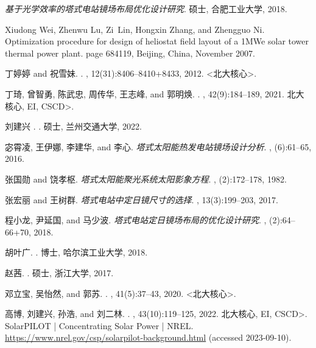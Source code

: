 \documentclass[withoutpreface,bwprint]{cumcmthesis} %
\begin{document}
\begin{thebibliography}{99}%
{\it 基于光学效率的塔式电站镜场布局优化设计研究}.
\newblock 硕士, 合肥工业大学, 2018.


Xiudong Wei, Zhenwu Lu, Zi~Lin, Hongxin Zhang, and Zhengguo Ni.
\newblock Optimization procedure for design of heliostat field layout of a
  {1MWe} solar tower thermal power plant.
\newblock page 684119, Beijing, China, November 2007.

 丁婷婷 and  祝雪妹.
.
, 12(31):8406--8410+8433, 2012.
{\textless}北大核心{\textgreater}.

 丁琦,  曾智勇,  陈武忠,  周传华,  王志峰, and  郭明焕.
.
, 42(9):184--189, 2021.
\newblock {\textless}北大核心, EI, CSCD{\textgreater}.

刘建兴 .
.
\newblock 硕士, 兰州交通大学, 2022.

 宓霄凌,  王伊娜,  李建华, and  李心.
{\it 塔式太阳能热发电站镜场设计分析}.
, (6):61--65, 2016.


 张国勋 and  饶孝枢.
{\it 塔式太阳能聚光系统太阳影象方程}.
, (2):172--178, 1982.


 张宏丽 and  王树群.
{\it 塔式电站中定日镜尺寸的选择}.
, 13(3):199--203,
  2017.


 程小龙,  尹延国, and  马少波.
{\it 塔式电站定日镜场布局的优化设计研究}.
, (2):64--66+70, 2018.


 胡叶广.
.
\newblock 博士, 哈尔滨工业大学, 2018.


 赵茜.
.
\newblock 硕士, 浙江大学, 2017.


 邓立宝,  吴怡然, and  郭苏.
.
, 41(5):37--43, 2020.
{\textless}北大核心{\textgreater}.

 高博,  刘建兴,  孙浩, and  刘二林.
.
, 43(10):119--125, 2022.
\newblock {\textless}北大核心, EI, CSCD{\textgreater}.
 SolarPILOT | Concentrating Solar Power | NREL. \url{https://www.nrel.gov/csp/solarpilot-background.html} (accessed 2023-09-10).


\end{thebibliography}
\end{document}
